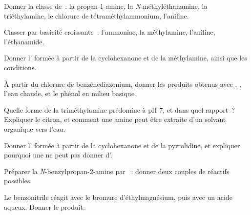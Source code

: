 \begin{exercise}[$\star$]\label{exo:b2:amines:1}
Donner la classe de~: la propan-1-amine, la \textit{N}-méthyléthanamine, la triéthylamine, le
chlorure de tétraméthylammonium, l'aniline.
\end{exercise}

\begin{exercise}[$\star$]\label{exo:b2:amines:2}
Classer par basicité croissante~: l'ammoniac, la méthylamine, l'aniline, l'éthanamide.
\end{exercise}

\begin{exercise}[$\star$]\label{exo:b2:amines:3}
Donner l' formée à partir de la cyclohexanone et de la méthylamine, ainsi que les conditions.
\end{exercise}

\begin{exercise}[$\star$]\label{exo:b2:amines:4}
À partir du chlorure de benzènediazonium, donner les produits obtenus avec , ,
l'eau chaude, et le phénol en milieu basique.
\end{exercise}

\begin{exercise}[$\star\star$]\label{exo:b2:amines:5}
Quelle forme de la triméthylamine prédomine à pH 7, et dans quel rapport~? Expliquer le citron,
et comment une amine peut être extraite d'un solvant organique vers l'eau.
\end{exercise}

\begin{exercise}[$\star\star$]\label{exo:b2:amines:6}
Donner l' formée à partir de la cyclohexanone et de la pyrrolidine, et expliquer pourquoi
une  ne peut pas donner d'.
\end{exercise}

\begin{exercise}[$\star\star$]\label{exo:b2:amines:7}
Préparer la \textit{N}-benzylpropan-2-amine  par ~:
donner deux couples de réactifs possibles.
\end{exercise}

\begin{exercise}[$\star\star$]\label{exo:b2:amines:8}
Le benzonitrile réagit avec le bromure d'éthylmagnésium, puis avec un acide aqueux. Donner le produit.
\end{exercise}

